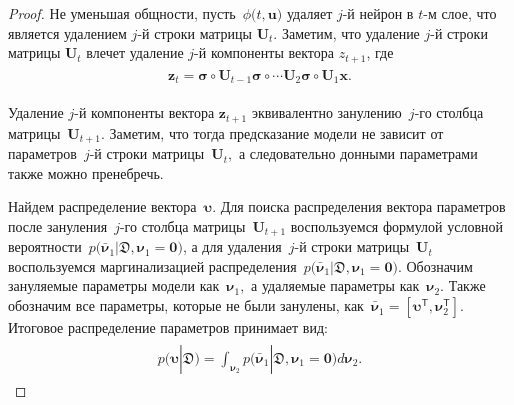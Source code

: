 \documentclass[12pt]{a&t}
\begin{document}
\begin{proof}
Не уменьшая общности, пусть~$\phi\bigr(t, \mathbf{u}\bigr)$ удаляет $j$-й нейрон в $t$-м слое, что является удалением $j$-й строки матрицы $\mathbf{U}_t$. Заметим, что удаление $j$-й строки матрицы $\mathbf{U}_t$ влечет удаление $j$-й компоненты вектора $z_{t+1}$, где
\begin{gather}
\label{eq:ap:tr:neural:1}
\begin{aligned}
\mathbf{z}_{t} = \bm{\sigma} \circ \mathbf{U}_{t-1} \bm{\sigma} \circ \cdots  \mathbf{U}_2\bm{\sigma} \circ \mathbf{U}_1\mathbf{x}.
\end{aligned}
\end{gather}

Удаление $j$-й компоненты вектора $\mathbf{z}_{t+1}$ эквивалентно занулению~$j$-го столбца матрицы~$\mathbf{U}_{t+1}.$ Заметим, что тогда предсказание модели не зависит от параметров~$j$-й строки матрицы~$\mathbf{U}_t,$ а следовательно донными параметрами также можно пренебречь.

Найдем распределение вектора~$\bm{\upsilon}.$ Для поиска распределения вектора параметров после зануления~$j$-го столбца матрицы~$\mathbf{U}_{t+1}$ воспользуемся формулой условной вероятности~$p\bigr(\bar{\bm{\nu}}_1|\mathfrak{D}, \bm{\nu}_1=\mathbf{0}\bigr)$, а для удаления~$j$-й строки матрицы~$\mathbf{U}_{t}$ воспользуемся маргинализацией распределения~$p\bigr(\bar{\bm{\nu}}_1|\mathfrak{D}, \bm{\nu}_1=\mathbf{0}\bigr)$. Обозначим зануляемые параметры модели как~$\bm{\nu}_1,$ а удаляемые параметры как~$\bm{\nu}_2.$ Также обозначим все параметры, которые не были занулены, как~$\bar{\bm{\nu}}_1 = [\bm{\upsilon}^{\mathsf{T}}, \bm{\nu}_2^{\mathsf{T}}].$ Итоговое распределение параметров принимает  вид:
\begin{gather}
\label{eq:ap:tr:1:1}
\begin{aligned}
p\bigr(\bm{\upsilon}|\mathfrak{D}\bigr)  = \int_{\bm{\nu}_2}p\bigr(\bar{\bm{\nu}}_1|\mathfrak{D}, \bm{\nu}_1=\mathbf{0}\bigr) d\bm{\nu}_2.
\end{aligned}
\end{gather}


\end{proof}
\end{document}
